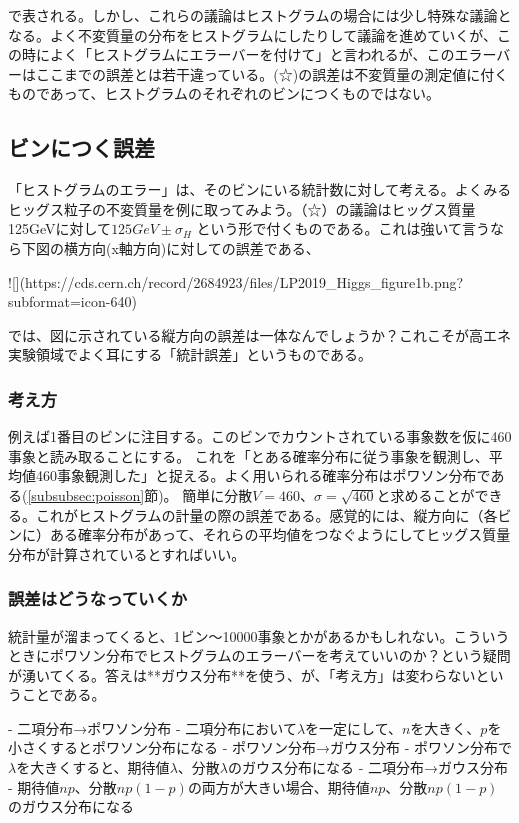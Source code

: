 \documentclass[uplatex]{jsarticle}
\begin{document}
で表される。しかし、これらの議論はヒストグラムの場合には少し特殊な議論となる。よく不変質量の分布をヒストグラムにしたりして議論を進めていくが、この時によく「ヒストグラムにエラーバーを付けて」と言われるが、このエラーバーはここまでの誤差とは若干違っている。(☆)の誤差は不変質量の測定値に付くものであって、ヒストグラムのそれぞれのビンにつくものではない。

\subsection{ビンにつく誤差}
「ヒストグラムのエラー」は、そのビンにいる統計数に対して考える。よくみるヒッグス粒子の不変質量を例に取ってみよう。（☆）の議論はヒッグス質量125GeVに対して$125GeV \pm \sigma_{H}$ という形で付くものである。これは強いて言うなら下図の横方向(x軸方向)に対しての誤差である、

![](https://cds.cern.ch/record/2684923/files/LP2019_Higgs_figure1b.png?subformat=icon-640)

では、図に示されている縦方向の誤差は一体なんでしょうか？これこそが高エネ実験領域でよく耳にする「統計誤差」というものである。

\subsubsection{考え方}
例えば1番目のビンに注目する。このビンでカウントされている事象数を仮に460事象と読み取ることにする。
これを「とある確率分布に従う事象を観測し、平均値460事象観測した」と捉える。よく用いられる確率分布はポワソン分布である(\ref{subsubsec:poisson}節)。
簡単に分散$V=460$、$\sigma=\sqrt{460}$と求めることができる。これがヒストグラムの計量の際の誤差である。感覚的には、縦方向に（各ビンに）ある確率分布があって、それらの平均値をつなぐようにしてヒッグス質量分布が計算されているとすればいい。

\subsubsection{誤差はどうなっていくか}
統計量が溜まってくると、1ビン〜10000事象とかがあるかもしれない。こういうときにポワソン分布でヒストグラムのエラーバーを考えていいのか？という疑問が湧いてくる。答えは**ガウス分布**を使う、が、「考え方」は変わらないということである。

- 二項分布→ポワソン分布
- 二項分布において$\lambda$を一定にして、$n$を大きく、$p$を小さくするとポワソン分布になる
- ポワソン分布→ガウス分布
- ポワソン分布で$\lambda$を大きくすると、期待値$\lambda$、分散$\lambda$のガウス分布になる
- 二項分布→ガウス分布
- 期待値$np$、分散$np(1-p)$の両方が大きい場合、期待値$np$、$分散np(1-p)$のガウス分布になる
\end{document}

